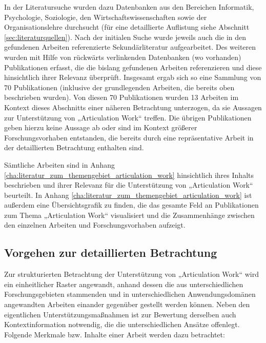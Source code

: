 In der Literatursuche wurden dazu Datenbanken aus den Bereichen Informatik, Psychologie, Soziologie, den Wirtschaftswissenschaften sowie der Organisationslehre durchsucht (für eine detaillierte Auflistung siehe Abschnitt \ref{sec:literaturquellen}). Nach der initialen Suche wurde jeweils auch die in den gefundenen Arbeiten referenzierte Sekundärliteratur aufgearbeitet. Des weiteren wurden mit Hilfe von rückwärts verlinkenden Datenbanken (wo vorhanden) Publikationen erfasst, die die bislang gefundenen Arbeiten referenzieren und diese hinsichtlich ihrer Relevanz überprüft. Insgesamt ergab sich so eine Sammlung von 70 Publikationen (inklusive der grundlegenden Arbeiten, die bereits oben beschrieben wurden). Von diesen 70 Publikationen wurden 13 Arbeiten im Kontext dieses Abschnitts einer näheren Betrachtung unterzogen, da sie Aussagen zur Unterstützung von „Articulation Work“ treffen. Die übrigen Publikationen geben hierzu keine Aussage ab oder sind im Kontext größerer Forschungsvorhaben entstanden, die bereits durch eine repräsentative Arbeit in der detaillierten Betrachtung enthalten sind. 

Sämtliche Arbeiten sind in Anhang \ref{cha:literatur_zum_themengebiet_articulation_work} hinsichtlich ihres Inhalts beschrieben und ihrer Relevanz für die Unterstützung von „Articulation Work“ beurteilt. In Anhang \ref{cha:literatur_zum_themengebiet_articulation_work} ist außerdem eine Übersichtsgrafik zu finden, die das gesamte Feld an Publikationen zum Thema „Articulation Work“ visualisiert und die Zusammenhänge zwischen den einzelnen Arbeiten und Forschungsvorhaben aufzeigt.

\subsection{Vorgehen zur detaillierten Betrachtung} %
\label{sub:vorgehen_zur_detaillierten_betrachtung}

Zur strukturierten Betrachtung der Unterstützung von „Articulation Work“ wird ein einheitlicher Raster angewandt, anhand dessen die aus unterschiedlichen Forschungsgebieten stammenden und in unterschiedlichen Anwendungsdomänen angewandten Arbeiten einander gegenüber gestellt werden können. Neben den eigentlichen Unterstützungsmaßnahmen ist zur Bewertung derselben auch Kontextinformation notwendig, die die unterschiedlichen Ansätze offenlegt. Folgende Merkmale bzw. Inhalte einer Arbeit werden dazu betrachtet:


